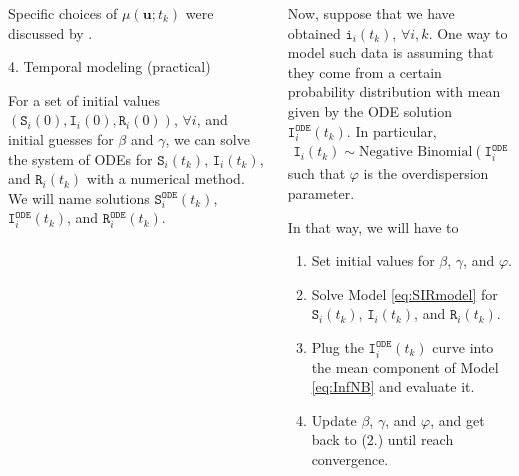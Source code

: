 \documentclass[12pt]{beamer}
\begin{document}
\begin{frame}[t]
\begin{columns}[t]
\begin{column}{0.24175\textwidth}
\begin{block}{}
			Specific choices of $\mu(\mathbf{u}; t_k)$ were discussed by \cite{diggle2006spatio}.
			
			\vspace{18pt}
			
			\textcolor{strong-blue}{\Large 4. Temporal modeling (practical)}\justifying\vspace{12pt}
			
			For a set of initial values  $(\texttt{S}_i(0), \texttt{I}_i(0), \texttt{R}_i(0))$, $\forall i$, and initial guesses for $\beta$ and $\gamma$, we can solve the system of ODEs for $\texttt{S}_i(t_k)$, $\texttt{I}_i(t_k)$, and $\texttt{R}_i(t_k)$ with a numerical method. We will name solutions $\texttt{S}_i^{\texttt{ODE}}(t_k)$, $\texttt{I}_i^{\texttt{ODE}}(t_k)$, and $\texttt{R}_i^{\texttt{ODE}}(t_k)$. 
			
			\vspace{33pt}
			\end{block}

			\end{column}
		
			\begin{column}{0.24175\textwidth} \justifying %
		
			\begin{block}{}
			\justifying
			
			Now, suppose that we have obtained $\texttt{i}_i(t_k)$, $\forall i, k$. One way to model such data is assuming that they come from a certain probability distribution with mean given by the ODE solution $\texttt{I}_i^{\texttt{ODE}}(t_k)$. In particular, 
			\begin{align} \label{eq:InfNB}
				\texttt{I}_i(t_k) \sim \text{Negative Binomial}(\texttt{I}_{i}^{\texttt{ODE}}(t_k), \varphi),
			\end{align}
			such that $\varphi$ is the overdispersion parameter. \vspace{12pt}
			
			In that way, we will have to\vspace{6pt}
			\begin{enumerate}
				\justifying
				\item Set initial values for $\beta$, $\gamma$, and $\varphi$.
				\item Solve Model \eqref{eq:SIRmodel} for $\texttt{S}_i(t_k)$, $\texttt{I}_i(t_k)$, and $\texttt{R}_i(t_k)$.
				\item Plug the $\texttt{I}_i^{\texttt{ODE}}(t_k)$ curve into the mean component of Model \eqref{eq:InfNB} and evaluate it.
				\item Update $\beta$, $\gamma$, and $\varphi$, and get back to (2.) until reach convergence.
			\end{enumerate}
			

\end{block}
\end{column}
\end{columns}
\end{frame}
\end{document}
